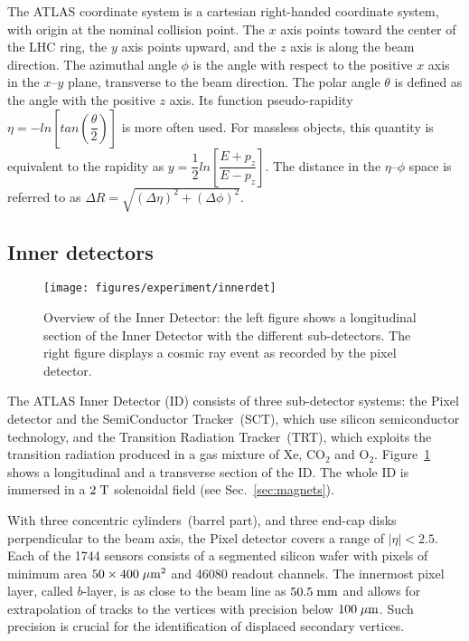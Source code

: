The ATLAS coordinate system is a cartesian right-handed coordinate
system, with origin at the nominal collision point. The $x$ axis
points toward the center of the LHC ring, the $y$ axis points upward,
and the $z$ axis is along the beam direction. The azimuthal angle
$\phi$ is the angle with respect to the positive $x$ axis in the
$x$--$y$ plane, transverse to the beam direction. The polar angle
$\theta$ is defined as the angle with the positive $z$ axis. Its
function pseudo-rapidity $\eta = -ln[tan(\dfrac{\theta}{2})]$ is more often
used. For massless objects, this quantity is equivalent to the
rapidity as $y = \dfrac{1}{2}ln[\dfrac{E+p_z}{E-p_z}]$. The distance in
the $\eta$--$\phi$ space is referred to as $\Delta R = \sqrt{(\Delta
  \eta)^2+(\Delta \phi)^2}$.

\subsection{Inner detectors}
\label{sec:ID}

\begin{figure}[ht]
\centering
\texttt{[image: figures/experiment/innerdet]}
\caption[Overview of the Inner Detector]{
  Overview of the Inner Detector: 
  the left figure shows a longitudinal section of the Inner Detector
  with the different sub-detectors.
  The right figure displays a cosmic ray event as recorded by the
  pixel detector.}
\label{fig:ID}
\end{figure}

The ATLAS Inner Detector (ID) consists of three sub-detector systems:
the Pixel detector and the SemiConductor Tracker~(SCT), which use
silicon semiconductor technology, and the Transition Radiation
Tracker~(TRT), which exploits the transition radiation produced in a
gas mixture of Xe, CO$_2$ and O$_2$.
Figure~\ref{fig:ID} shows a longitudinal and a transverse section of
the ID. The whole ID is immersed in a \mbox{$2 \; \mathrm{T}$} solenoidal field
(see Sec.~\ref{sec:magnets}).

With three concentric cylinders~(barrel part), and three end-cap disks
perpendicular to the beam axis, the Pixel detector covers a range of
\mbox{$|\eta| < 2.5$}.
Each of the 1744 sensors consists of a segmented silicon wafer with
pixels of minimum area \mbox{$50 \times 400 \; \mu\mathrm{m}^2$} and 46080 readout
channels. The innermost pixel layer, called $b$-layer, is as close to
the beam line as \mbox{$50.5 \; \mathrm{mm}$} and allows for extrapolation of
tracks to the vertices with precision below \mbox{$100 \; \mu\mathrm{m}$}.
Such precision is crucial for the identification of displaced
secondary vertices.

